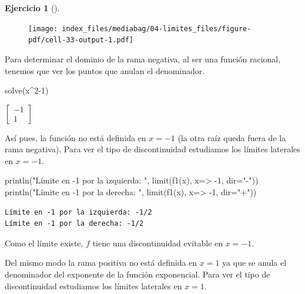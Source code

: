 \documentclass[
  a4paper,
]{scrreport}
\newenvironment{Shaded}{\begin{snugshade}}{\end{snugshade}}
\newcommand{\FloatTok}[1]{\textcolor[rgb]{0.68,0.00,0.00}{#1}}
\newcommand{\FunctionTok}[1]{\textcolor[rgb]{0.28,0.35,0.67}{#1}}
\newcommand{\NormalTok}[1]{\textcolor[rgb]{0.00,0.23,0.31}{#1}}
\newcommand{\OperatorTok}[1]{\textcolor[rgb]{0.37,0.37,0.37}{#1}}
\newcommand{\StringTok}[1]{\textcolor[rgb]{0.13,0.47,0.30}{#1}}
\theoremstyle{definition}
\newtheorem{exercise}{Ejercicio}[chapter]
\theoremstyle{remark}
\begin{document}
\begin{exercise}[]
\begin{tcolorbox}
\begin{figure}[H]

{\centering \texttt{[image: index\_files/mediabag/04-limites\_files/figure-pdf/cell-33-output-1.pdf]}

}

\end{figure}

Para determinar el dominio de la rama negativa, al ser una función
racional, tenemos que ver los puntos que anulan el denominador.

\begin{Shaded}
\begin{Highlighting}[]
\FunctionTok{solve}\NormalTok{(x}\OperatorTok{\^{}}\FloatTok{2}\OperatorTok{{-}}\FloatTok{1}\NormalTok{)}
\end{Highlighting}
\end{Shaded}

$\left[ \begin{array}{r}-1\\1\end{array} \right]$

Así pues, la función no está definida en \(x=-1\) (la otra raíz queda
fuera de la rama negativa). Para ver el tipo de discontinuidad
estudiamos los límites laterales en \(x=-1\).

\begin{Shaded}
\begin{Highlighting}[]
\FunctionTok{println}\NormalTok{(}\StringTok{"Límite en {-}1 por la izquierda: "}\NormalTok{, }\FunctionTok{limit}\NormalTok{(}\FunctionTok{f1}\NormalTok{(x), x}\OperatorTok{=\textgreater{}} \OperatorTok{{-}}\FloatTok{1}\NormalTok{, dir}\OperatorTok{=}\StringTok{"{-}"}\NormalTok{))}
\FunctionTok{println}\NormalTok{(}\StringTok{"Límite en {-}1 por la derecha: "}\NormalTok{, }\FunctionTok{limit}\NormalTok{(}\FunctionTok{f1}\NormalTok{(x), x}\OperatorTok{=\textgreater{}} \OperatorTok{{-}}\FloatTok{1}\NormalTok{, dir}\OperatorTok{=}\StringTok{"+"}\NormalTok{))}
\end{Highlighting}
\end{Shaded}

\begin{verbatim}
Límite en -1 por la izquierda: -1/2
Límite en -1 por la derecha: -1/2
\end{verbatim}

Como el límite existe, \(f\) tiene una discontinuidad evitable en
\(x=-1\).

Del mismo modo la rama positiva no está definida en \(x=1\) ya que se
anula el denominador del exponente de la función exponencial. Para ver
el tipo de discontinuidad estudiamos los límites laterales en \(x=1\).


\end{tcolorbox}
\end{exercise}
\end{document}
